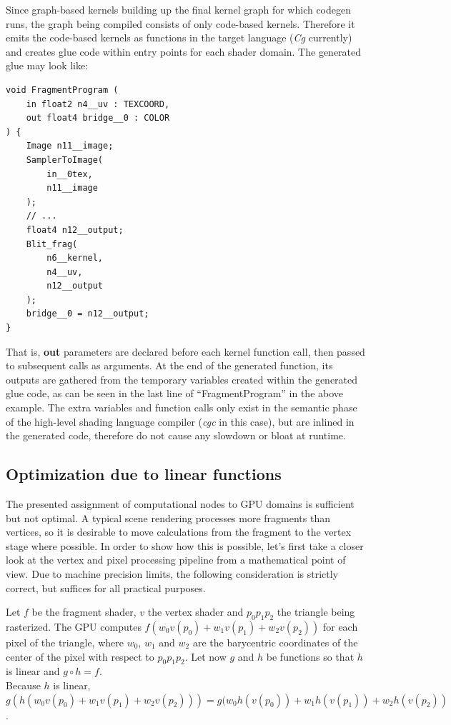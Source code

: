Since graph-based kernels building up the final kernel graph for which codegen runs, the graph being compiled consists of only code-based kernels. Therefore it emits the code-based kernels as functions in the target language (\emph{Cg} currently) and creates glue code within entry points for each shader domain. The generated glue may look like:
\begin{lstlisting}[frame=single]
void FragmentProgram (
	in float2 n4__uv : TEXCOORD,
	out float4 bridge__0 : COLOR
) {
	Image n11__image;
	SamplerToImage(
		in__0tex,
		n11__image
	);
	// ...
	float4 n12__output;
	Blit_frag(
		n6__kernel,
		n4__uv,
		n12__output
	);
	bridge__0 = n12__output;
}
\end{lstlisting}
That is, \textbf{out} parameters are declared before each kernel function call, then passed to subsequent calls as arguments. At the end of the generated function, its outputs are gathered from the temporary variables created within the generated glue code, as can be seen in the last line of ``FragmentProgram'' in the above example. The extra variables and function calls only exist in the semantic phase of the high-level shading language compiler (\emph{cgc} in this case), but are inlined in the generated code, therefore do not cause any slowdown or bloat at runtime.

\subsection{Optimization due to linear functions}

The presented assignment of computational nodes to GPU domains is sufficient but not optimal. A typical scene rendering processes more fragments than vertices, so it is desirable to move calculations from the fragment to the vertex stage where possible. In order to show how this is possible, let's first take a closer look at the vertex and pixel processing pipeline from a mathematical point of view. Due to machine precision limits, the following consideration is strictly correct, but suffices for all practical purposes.

Let $f$ be the fragment shader, $v$ the vertex shader and $p_0 p_1 p_2$ the triangle being rasterized. The GPU computes $f(w_0 v(p_0) + w_1 v(p_1) + w_2 v(p_2))$ for each pixel of the triangle, where $w_0$, $w_1$ and $w_2$ are the barycentric coordinates of the center of the pixel with respect to $p_0 p_1 p_2$. Let now $g$ and $h$ be functions so that $h$ is linear and $g \circ h = f$. \\
Because $h$ is linear, \\
$g(h(w_0 v(p_0) + w_1 v(p_1) + w_2 v(p_2))) = g(w_0 h(v(p_0)) + w_1 h(v(p_1)) + w_2 h(v(p_2))$.

